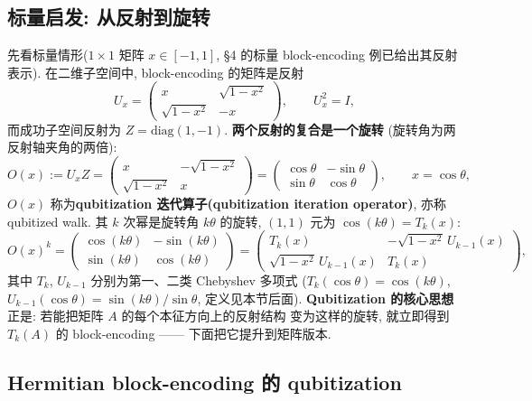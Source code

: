 \documentclass[utf8]{article} %
\numberwithin{equation}{section}   %
\begin{document}
\subsection{标量启发: 从反射到旋转}

先看标量情形($1\times1$ 矩阵 $x \in [-1,1]$, §4 的标量 block-encoding 例已给出其反射表示).
在二维子空间中, block-encoding 的矩阵是反射
\begin{equation}
    U_x = \begin{pmatrix} x & \sqrt{1-x^2} \\ \sqrt{1-x^2} & -x \end{pmatrix},
    \qquad U_x^2 = I,
\end{equation}
而成功子空间反射为 $Z = \mathrm{diag}(1,-1)$. \textbf{两个反射的复合是一个旋转}
(旋转角为两反射轴夹角的两倍):
\begin{equation}
    O(x) := U_x Z = \begin{pmatrix} x & -\sqrt{1-x^2} \\ \sqrt{1-x^2} & x \end{pmatrix}
    = \begin{pmatrix} \cos\theta & -\sin\theta \\ \sin\theta & \cos\theta \end{pmatrix},
    \qquad x = \cos\theta,
\end{equation}
$O(x)$ 称为\textbf{qubitization 迭代算子(qubitization iteration operator)}, 亦称 qubitized walk.
其 $k$ 次幂是旋转角 $k\theta$ 的旋转, $(1,1)$ 元为 $\cos(k\theta) = T_k(x)$:
\begin{equation}
    O(x)^k = \begin{pmatrix} \cos(k\theta) & -\sin(k\theta) \\ \sin(k\theta) & \cos(k\theta) \end{pmatrix}
    = \begin{pmatrix} T_k(x) & -\sqrt{1-x^2}\,U_{k-1}(x) \\
        \sqrt{1-x^2}\,U_{k-1}(x) & T_k(x) \end{pmatrix},
\end{equation}
其中 $T_k$, $U_{k-1}$ 分别为第一、二类 Chebyshev 多项式
($T_k(\cos\theta) = \cos(k\theta)$, $U_{k-1}(\cos\theta) = \sin(k\theta)/\sin\theta$,
定义见本节后面).
\textbf{Qubitization 的核心思想}正是: 若能把矩阵 $A$ 的每个本征方向上的反射结构
变为这样的旋转, 就立即得到 $T_k(A)$ 的 block-encoding —— 下面把它提升到矩阵版本.

\subsection{Hermitian block-encoding 的 qubitization}
\end{document}

